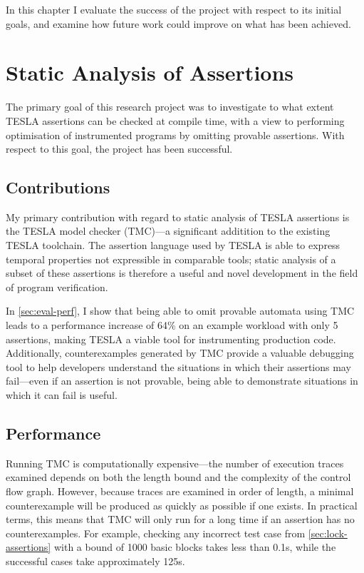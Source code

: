 In this chapter I evaluate the success of the project with respect to its
initial goals, and examine how future work could improve on what has been
achieved.

\section{Static Analysis of Assertions}

The primary goal of this research project was to investigate to what extent
TESLA assertions can be checked at compile time, with a view to performing
optimisation of instrumented programs by omitting provable assertions. With
respect to this goal, the project has been successful.

\subsection{Contributions}

My primary contribution with regard to static analysis of TESLA assertions is
the TESLA model checker (TMC)---a significant additition to the existing TESLA
toolchain. The assertion language used by TESLA is able to express temporal
properties not expressible in comparable tools; static analysis of a subset of
these assertions is therefore a useful and novel development in the field of
program verification.

In \autoref{sec:eval-perf}, I show that being able to omit provable automata
using TMC leads to a performance increase of 64\% on an example workload with
only 5 assertions, making TESLA a viable tool for instrumenting production code.
Additionally, counterexamples generated by TMC provide a valuable debugging tool
to help developers understand the situations in which their assertions may
fail---even if an assertion is not provable, being able to demonstrate
situations in which it can fail is useful.

\subsection{Performance}

Running TMC is computationally expensive---the number of execution traces
examined depends on both the length bound and the complexity of the control flow
graph. However, because traces are examined in order of length, a minimal
counterexample will be produced as quickly as possible if one exists. In
practical terms, this means that TMC will only run for a long time if an
assertion has no counterexamples. For example, checking any incorrect test case
from \autoref{sec:lock-assertions} with a bound of \num{1000} basic blocks takes
less than \num{0.1}\si{\second}, while the successful cases take approximately
\num{125}\si{\second}.

